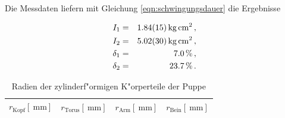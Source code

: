 				Die Messdaten liefern mit Gleichung \eqref{eqn:schwingungsdauer} die Ergebnisse

				\begin{eqnarray*}
					I_1 & = & \SI{1.84 (15)}{\kilo \gram \centi \meter \squared} \,, \\
					I_2 & = & \SI{5.02 (30)}{\kilo \gram \centi \meter \squared} \,, \\
					\delta_1 & = & \SI{7.0}{\percent} \,, \\
					\delta_2 & = & \SI{23.7}{\percent} \,.
				\end{eqnarray*}

				\clearpage

				\begin{table}[h!]
					\begin{center}
						\label{tabelle:puppenradien}
						\caption{Radien der zylinderf"ormigen K"orperteile der Puppe}
						\begin{tabular}{|c|c|c|c|}
							\hline
							$r_\mathrm{Kopf} [\SI{}{\milli \meter}]$ & $r_\mathrm{Torus} [\SI{}{\milli \meter}]$ & $r_\mathrm{Arm} [\SI{}{\milli \meter}]$ & $r_\mathrm{Bein} [\SI{}{\milli \meter}]$ \\
							\hline 
							\hline
							
							\hline 
						\end{tabular}
					\end{center}
				\end{table}

